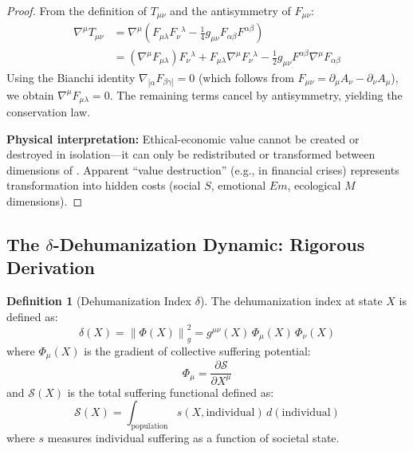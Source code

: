 \documentclass[11pt,a4paper]{article}
\theoremstyle{definition}
\newtheorem{definition}{Definition}[section]
\theoremstyle{remark}
\begin{document}
\begin{proof}
From the definition of $T_{\mu\nu}$ and the antisymmetry of $F_{\mu\nu}$:
\begin{align*}
\nabla^\mu T_{\mu\nu} &= \nabla^\mu \left( F_{\mu\lambda} F_\nu{}^\lambda - \frac{1}{4} g_{\mu\nu} F_{\alpha\beta} F^{\alpha\beta} \right) \\
&= (\nabla^\mu F_{\mu\lambda}) F_\nu{}^\lambda + F_{\mu\lambda} \nabla^\mu F_\nu{}^\lambda - \frac{1}{2} g_{\mu\nu} F^{\alpha\beta} \nabla^\mu F_{\alpha\beta}
\end{align*}
Using the Bianchi identity $\nabla_{[\alpha} F_{\beta\gamma]} = 0$ (which follows from $F_{\mu\nu} = \partial_\mu A_\nu - \partial_\nu A_\mu$), we obtain $\nabla^\mu F_{\mu\lambda} = 0$. The remaining terms cancel by antisymmetry, yielding the conservation law.

\textbf{Physical interpretation:} Ethical-economic value cannot be created or destroyed in isolation---it can only be redistributed or transformed between dimensions of \SESES. Apparent ``value destruction'' (e.g., in financial crises) represents transformation into hidden costs (social $S$, emotional $Em$, ecological $M$ dimensions).
\end{proof}

\subsection{The $\delta$-Dehumanization Dynamic: Rigorous Derivation}
\label{app:delta_dynamics}

\begin{definition}[Dehumanization Index $\delta$]
The dehumanization index at state $X$ is defined as:
\[
\delta(X) = \left\| \Phi(X) \right\|_g^2 = g^{\mu\nu}(X) \, \Phi_\mu(X) \, \Phi_\nu(X)
\]
where $\Phi_\mu(X)$ is the gradient of collective suffering potential:
\[
\Phi_\mu = \frac{\partial \mathcal{S}}{\partial X^\mu}
\]
and $\mathcal{S}(X)$ is the total suffering functional defined as:
\[
\mathcal{S}(X) = \int_{\text{population}} s(X, \text{individual}) \, d(\text{individual})
\]
where $s$ measures individual suffering as a function of societal state.
\end{definition}
\end{document}

